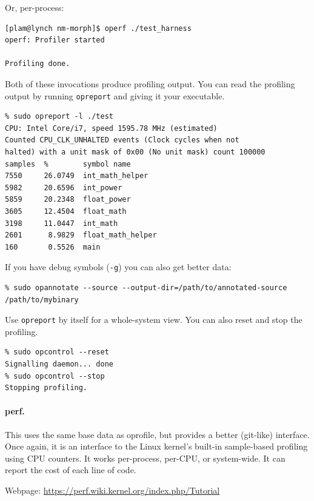 \documentclass[11pt]{article}
\begin{document}
Or, per-process:
\begin{lstlisting}
[plam@lynch nm-morph]$ operf ./test_harness
operf: Profiler started

Profiling done.
\end{lstlisting}%

Both of these invocations produce profiling output. You can read the profiling output
by running {\tt opreport} and giving it your executable.

  \begin{lstlisting}
% sudo opreport -l ./test    
CPU: Intel Core/i7, speed 1595.78 MHz (estimated)
Counted CPU_CLK_UNHALTED events (Clock cycles when not
halted) with a unit mask of 0x00 (No unit mask) count 100000
samples  %        symbol name
7550     26.0749  int_math_helper
5982     20.6596  int_power
5859     20.2348  float_power
3605     12.4504  float_math
3198     11.0447  int_math
2601      8.9829  float_math_helper
160       0.5526  main
  \end{lstlisting}
  If you have debug symbols ({\tt -g}) you can also get better data:
  {\small
  \begin{lstlisting}
% sudo opannotate --source --output-dir=/path/to/annotated-source /path/to/mybinary
  \end{lstlisting}
  }

Use {\tt opreport} by itself for a whole-system view.
    You can also reset and stop the profiling.
  \begin{lstlisting}
% sudo opcontrol --reset 
Signalling daemon... done
% sudo opcontrol --stop
Stopping profiling.
  \end{lstlisting}

\paragraph{perf.} This uses the same base data as oprofile, but provides a better
(git-like) interface. Once again, it is an interface to the Linux kernel's built-in
sample-based profiling using CPU counters. It works per-process, per-CPU, or system-wide.
It can report the cost of each line of code.

Webpage: \url{https://perf.wiki.kernel.org/index.php/Tutorial}
\end{document}
